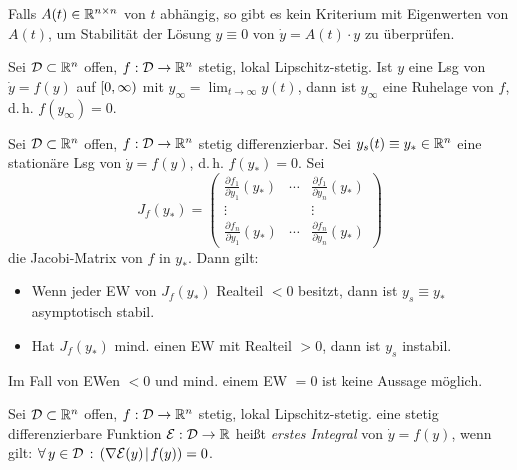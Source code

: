 \documentclass{cheat-sheet}
\newcommand{\D}{\mathcal{D}}
\newcommand{\E}{\mathcal{E}}
\newcommand{\scp}[2]{\left( #1 \!\mid\! #2 \right)} %
\begin{document}

\begin{bem}
  Falls $A(t) \in \mathbb{R}^{n \times n}$ von $t$ abhängig, so gibt es kein Kriterium mit Eigenwerten von $A(t)$, um Stabilität der Lösung $y \equiv 0$ von $\dot{y} = A(t) \cdot y$ zu überprüfen.
\end{bem}


\begin{lem}
  Sei $\D \subset \R^n$ offen, $f : \D \to \R^n$ stetig, lokal Lipschitz-stetig. Ist $y$ eine Lsg von $\dot{y} = f(y)$ auf $\left[ 0, \infty \right)$ mit $y_{\infty} = \lim_{t \to \infty} y(t)$, dann ist $y_{\infty}$ eine Ruhelage von $f$, d.\,h. $f(y_{\infty}) = 0$.
\end{lem}

\begin{satz}
  Sei $\D \subset \R^n$ offen, $f : \D \to \R^n$ stetig differenzierbar. Sei $y_s(t) \equiv y_{*} \in \mathbb{R}^n$ eine stationäre Lsg von $\dot{y} = f(y)$, d.\,h. $f(y_{*}) = 0$. Sei
  \[
    J_f(y_{*}) = \begin{pmatrix}
      \frac{\partial f_1}{\partial y_1}(y_{*}) & \cdots & \frac{\partial f_1}{\partial y_n} (y_{*}) \\
      \vdots & & \vdots \\
      \frac{\partial f_n}{\partial y_1} (y_{*}) & \cdots & \frac{\partial f_n}{\partial y_n} (y_{*})
    \end{pmatrix}
  \]
  die Jacobi-Matrix von $f$ in $y_{*}$. Dann gilt:
  \begin{itemize}
    \item Wenn jeder EW von $J_f(y_{*})$ Realteil $< 0$ besitzt, dann ist $y_s \equiv y_{*}$ asymptotisch stabil.
    \item Hat $J_f(y_{*})$ mind. einen EW mit Realteil $> 0$, dann ist $y_s$ instabil.
  \end{itemize}
\end{satz}


\begin{bem}
  Im Fall von EWen $< 0$ und mind. einem EW $= 0$ ist keine Aussage möglich.
\end{bem}


\begin{defn}
  Sei $\D \subset \R^n$ offen, $f : \D \to \R^n$ stetig, lokal Lipschitz-stetig. eine stetig differenzierbare Funktion $\E : \D \to \R$ heißt \emph{erstes Integral} von $\dot{y} = f(y)$, wenn gilt: $\fa{y \in \D} \scp{\nabla \E(y)}{f(y)} = 0$.
\end{defn}
\end{document}
